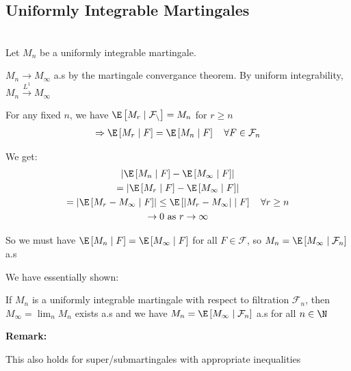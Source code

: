 \subsection{Uniformly Integrable Martingales}\hfill\\
\noindent Let $M_n$ be a uniformly integrable martingale.\par

\noindent $M_n\to M_\infty$ a.s by the martingale convergance theorem. By uniform integrability, $M_n\stackrel{L^1}{\to}M_\infty$
\par\bigskip
\noindent For any fixed $n$, we have $\E\left[M_r\mid\mathcal{F_n}\right] = M_n$ for $r\geq n$
\begin{equation*}
  \begin{gathered}
    \Rightarrow \E\left[M_r\mid F\right] = \E\left[M_n\mid F\right]\quad\forall F\in \mathcal{F}_n
  \end{gathered}
\end{equation*}\par
\noindent We get:
\begin{equation*}
  \begin{gathered}
    \left|\E\left[M_n\mid F\right]-\E\left[M_\infty\mid F\right]\right|\\
    = \left|\E\left[M_r\mid F\right]-\E\left[M_\infty\mid F\right]\right|\\
    =\left|\E\left[M_r-M_\infty\mid F\right]\right|\leq \E\left[\left|M_r-M_\infty\right|\mid F\right]\quad\forall r\geq n\\
    \to0\text{ as } r\to\infty
  \end{gathered}
\end{equation*}\par
\noindent So we must have $\E\left[M_n\mid F\right] = \E\left[M_\infty\mid F\right]$ for all $F\in\mathcal{F}$, so $M_n = \E\left[M_\infty\mid \mathcal{F}_n\right]$ a.s
\par\bigskip
\noindent We have essentially shown:
\par\bigskip
\begin{theo}[]{}
  If $M_n$ is a uniformly integrable martingale with respect to filtration $\mathcal{F}_n$, then $M_\infty = \lim_{n}M_n$ exists a.s and we have $M_n = \E\left[M_\infty\mid\mathcal{F}_n\right]$ a.s for all $n\in\N$
\end{theo}
\par\bigskip
\noindent\textbf{Remark:}\par
\noindent This also holds for super/submartingales with appropriate inequalities
\par\bigskip
